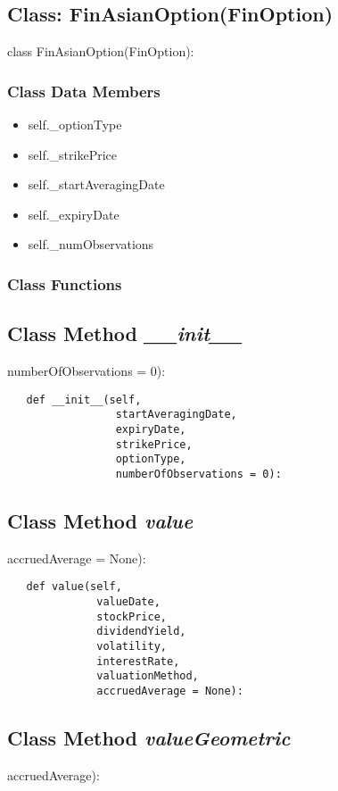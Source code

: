 \documentclass[twoside,11pt]{book}
\begin{document}
\subsection{Class: FinAsianOption(FinOption)}
class FinAsianOption(FinOption):

\subsubsection{Class Data Members}
\begin{itemize}
\item{self.\_optionType}
\item{self.\_strikePrice}
\item{self.\_startAveragingDate}
\item{self.\_expiryDate}
\item{self.\_numObservations}
\end{itemize}

\subsubsection{Class Functions}

\subsection{Class Method {\it \_\_init\_\_}}
numberOfObservations = 0):

\begin{lstlisting}
   def __init__(self,
                 startAveragingDate,
                 expiryDate,
                 strikePrice,
                 optionType,
                 numberOfObservations = 0):
\end{lstlisting}

\subsection{Class Method {\it value}}
accruedAverage = None):

\begin{lstlisting}
   def value(self,
              valueDate,
              stockPrice,
              dividendYield,
              volatility,
              interestRate,
              valuationMethod,
              accruedAverage = None):
\end{lstlisting}

\subsection{Class Method {\it valueGeometric}}
accruedAverage):
\end{document}
